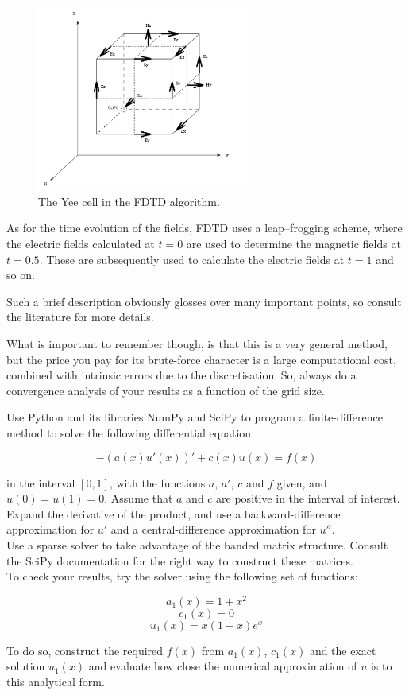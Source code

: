 \begin{figure}
\centering
\includegraphics[width=7cm]{numeric/figures/yeecell}
\caption{The Yee cell in the FDTD algorithm.}
\label{fig-yee}
\end{figure}

As for the time evolution of the fields, FDTD uses a leap--frogging scheme, where the electric fields calculated at $t=0$ are used to determine the magnetic fields at $t=0.5$. These are subsequently used to calculate the electric fields at $t=1$ and so on.

Such a brief description obviously glosses over many important points, so consult the literature for more details.

What is important to remember though, is that this is a very general method, but the price you pay for its brute-force character is a large computational cost, combined with intrinsic errors due to the discretisation. So, always do a convergence analysis of your results as a function of the grid size.

\pagebreak

\begin{exer}
Use Python and its libraries NumPy and SciPy to program a finite-difference method to solve the following differential equation

$$ -\left(a(x) u'(x) \right)' + c(x)u(x) = f(x)$$

in the interval $[0,1]$, with the functions $a$, $a'$, $c$ and $f$ given, and $u(0) = u(1) = 0$. Assume that $a$ and $c$ are positive in the interval of interest.\\

Expand the derivative of the product, and use a backward-difference approximation for $u'$ and a central-difference approximation for $u''$. \\

Use a sparse solver to take advantage of the banded matrix structure. Consult the SciPy documentation for the right way to construct these matrices. \\

To check your results, try the solver using the following set of functions:

$$a_1(x) = 1 + x^2$$
$$c_1(x) = 0$$
$$u_1(x) = x(1-x) e^x $$

To do so, construct the required $f(x)$ from $a_1(x)$, $c_1(x)$ and the exact solution $u_1(x)$ and evaluate how close the numerical approximation of $u$ is to this analytical form.

\end{exer}



